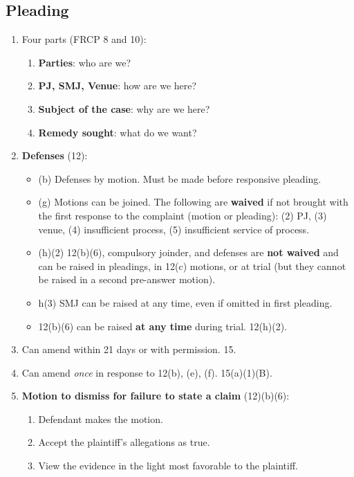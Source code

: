 \subsection{Pleading}

\begin{enumerate}
    \item Four parts (FRCP 8 and 10):
    \begin{enumerate}
        \item \textbf{Parties}: who are we?
        \item \textbf{PJ, SMJ, Venue}: how are we here?
        \item \textbf{Subject of the case}: why are we here?
        \item \textbf{Remedy sought}: what do we want?
    \end{enumerate}    \item \textbf{Defenses} (12):
    \begin{itemize}
        \item (b) Defenses by motion. Must be made before responsive pleading.
        \item (g) Motions can be joined. The following are \textbf{waived} if 
        not brought with the first response to the complaint (motion or 
        pleading): (2) PJ, (3) venue, (4) insufficient process, (5) 
        insufficient service of process.
        \item (h)(2) 12(b)(6), compulsory joinder, and defenses are 
        \textbf{not waived} and can be raised in pleadings, in 12(c) motions, 
        or at trial (but they cannot be raised in a second pre-answer motion).
        \item h(3) SMJ can be raised at any time, even if omitted in first 
        pleading.
        \item 12(b)(6) can be raised \textbf{at any time} during trial.  
        12(h)(2).
    \end{itemize}
    \item Can amend within 21 days or with permission. 15.
    \item Can amend \emph{once} in response to 12(b), (e), (f). 15(a)(1)(B).
    \item \textbf{Motion to dismiss for failure to state a claim} (12)(b)(6):
    \begin{enumerate}
        \item Defendant makes the motion.
        \item Accept the plaintiff's allegations as true.
        \item View the evidence in the light most favorable to the plaintiff.

\end{enumerate}
\end{enumerate}
